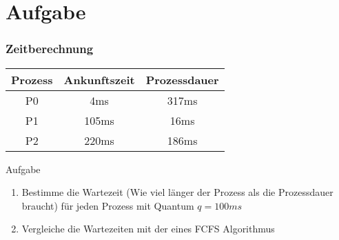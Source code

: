 \section{Aufgabe}

\begin{frame}
    \frametitle{Zeitberechnung}

    \begin{table}[]
        \begin{tabular}{c|c|c}
            \textbf{Prozess} & \textbf{Ankunftszeit} & \textbf{Prozessdauer} \\
            \hline{}
            P0               & 4ms                   & 317ms                 \\
            P1               & 105ms                 & 16ms                  \\
            P2               & 220ms                 & 186ms
        \end{tabular}
    \end{table}

    \begin{block}{Aufgabe}
        \begin{enumerate}
            \item Bestimme die Wartezeit (Wie viel l{\"a}nger der Prozess als die Prozessdauer braucht) f{\"u}r jeden Prozess mit Quantum $q = 100ms$
            \item Vergleiche die Wartezeiten mit der eines FCFS Algorithmus
        \end{enumerate}
    \end{block}

\end{frame}

